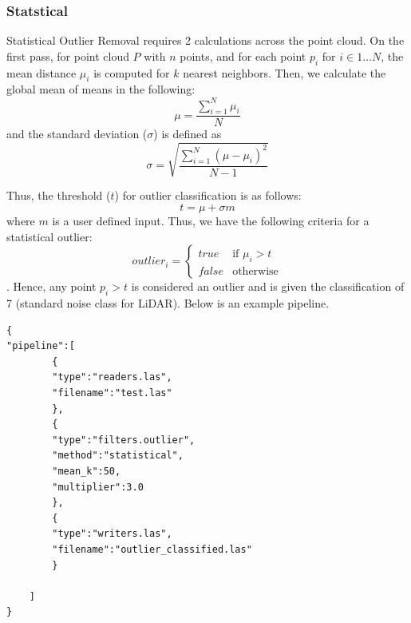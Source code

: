 \documentclass[11pt]{article}
\theoremstyle{definition}
\begin{document}
\subsubsection{Statstical}\label{subsub:stat}
Statistical Outlier Removal requires 2 calculations across the point cloud.  On the first pass, for point cloud $P$ with $n$ points, and for each point $p_i$ for $i\in 1 \ldots N$, the mean distance $\mu_i$ is computed for $k$ nearest neighbors.  Then, we calculate the global mean of means in the following:
\begin{equation}\label{eqn:average} 
\mu=\dfrac{\sum_{i=1}^{N} \mu_{i}}{N} 
\end{equation}
and the standard deviation ($\sigma$) is defined as
\begin{equation}\label{eqn:std} 
\sigma=\sqrt{\dfrac{\sum_{i=1}^{N} (\mu-\mu_{i})^2}{N-1}} 
\end{equation}

Thus, the threshold ($t$) for outlier classification is as follows:
\begin{equation}\label{eqn:threshold}
t=\mu+\sigma m
\end{equation}
where $m$ is a user defined input.  Thus, we have the following criteria for a statistical outlier:
\begin{equation}\label{eqn:stat_rule}
outlier_{i}=\begin{cases}
true & \text{if $\mu_{i}>t$}\\
false & \text{otherwise}
\end{cases}
\end{equation}.  
Hence, any point $p_i > t$ is considered an outlier and is given the classification of 7 (standard noise class for LiDAR).  Below is an example pipeline.
\begin{lstlisting}[title=Statistical outlier pipeline, label=stat]
{
"pipeline":[
		{
		"type":"readers.las",
		"filename":"test.las"
		},
		{
		"type":"filters.outlier",
		"method":"statistical",
		"mean_k":50,
		"multiplier":3.0
		},
		{
		"type":"writers.las",
		"filename":"outlier_classified.las"
		}

	]
}
\end{lstlisting} 
\end{document}
